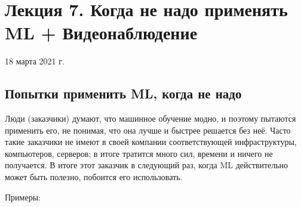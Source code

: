 \documentclass[main.tex]{subfiles}
\begin{document}
\section{Лекция 7. Когда не надо применять ML + Видеонаблюдение}
18 марта 2021 г.

\subsection{Попытки применить ML, когда не надо}

Люди (заказчики) думают, что машинное обучение модно, и поэтому пытаются применить его, не понимая, что она лучше и быстрее решается без неё.
Часто такие заказчики не имеют в своей компании соответствующей инфраструктуры, компьютеров, серверов; в итоге тратится много сил, времени и ничего не получается.
В итоге этот заказчик в следующий раз, когда ML действительно может быть полезно, побоится его использовать.

Примеры:
\end{document}
